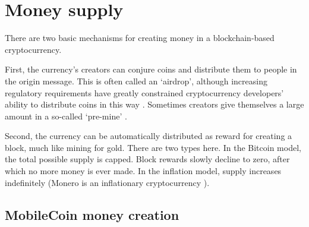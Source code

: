 


\section{Money supply}
\label{sec:money-supply}

There are two basic mechanisms for creating money in a blockchain-based cryptocurrency.

First, the currency's creators can conjure coins and distribute them to people in the origin message. This is often called an `airdrop', although increasing regulatory requirements have greatly constrained cryptocurrency developers' ability to distribute coins in this way \cite{telegram-sec-token-shut-down, ripple-sec-token-shut-down}. Sometimes creators give themselves a large amount in a so-called `pre-mine' \cite{premine-description}.

Second, the currency can be automatically distributed as reward for creating a block, much like mining for gold. There are two types here. In the Bitcoin model, the total possible supply is capped. Block rewards slowly decline to zero, after which no more money is ever made. In the inflation model, supply increases indefinitely (Monero is an inflationary cryptocurrency \cite{ztm-2}).


\subsection{MobileCoin money creation}
\label{subsec:blockchain-mobilecoin-money-creation}

